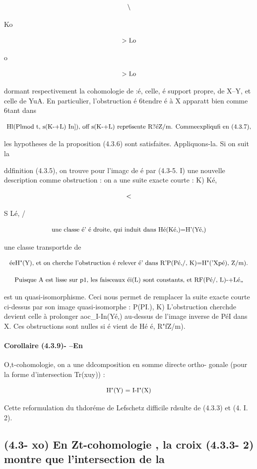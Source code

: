 \documentclass[11pt]{article}
\theoremstyle{remark}
\begin{document}
\[\text{\small \textbackslash{}}\]

Ko

\[\text{\small > Lo}\]

o

\[\text{\small > Lo}\]

dormant respectivement la cohomologie de :é, celle, é support propre, de X--Y, et celle de YuA. En particulier, l'obstruction é 6tendre é à X apparatt bien comme 6tant dans

\[\text{\small Hl(Plmod t, s(K-+L) In]), off s(K-+L) repr6sente R?éZ/m. Commeexpliqufi en (4.3.7),}\]

les hypotheses de la proposition (4.3.6) sont satisfaites. Appliquons-la. Si on suit la

ddfinition (4.3.5), on trouve pour l'imagc de é par (4.3-5. I) une nouvelle description comme obstruction : on a une suite exacte courte : K) Ké,

\[\text{\small <}\]

S Lé, /

\[\text{\small une classe é' é droite, qui induit dans Hé(Ké,)=H'(Yé,)}\]

une classe transportde de

\[\text{\small éeH"(Y), et on cherche l'obstruction é relever é' dans R'P(Pé,/, K)=H"('Xpé), Z/m).}\]

\[\text{\small Puisque A est lisse sur p1, les faisceaux éi(L) sont constants, et RF(Pé/, L)-+Lé,,}\]

est un quasi-isomorphisme. Ceci nous permet de remplacer la suite exacte courte ci-dessus par son image quasi-isomorphe : P(PI.), K) L'obstruction cherchde devient celle à prolonger aoc\_I-In(Yé,) au-dessus de l'image inverse de PéI dans X. Ces obstructions sont nulles si é vient de Hé é, R"fZ/m).

\paragraph{Corollaire (4.3.9)- --En}

O,t-cohomologie, on a une ddcomposition en somme directe ortho- gonale (pour la forme d'intersection Tr(xuy)) :

\[\text{\small H"(Y) = I-I"(X)}\]

Cette reformulation du thdoréme de Lefschetz difficile rdsulte de (4.3.3) et (4. I. 2).

\subsection*{(4.3- xo) En Zt-cohomologie , la croix (4.3.3- 2) montre que l'intersection de la}
\end{document}
